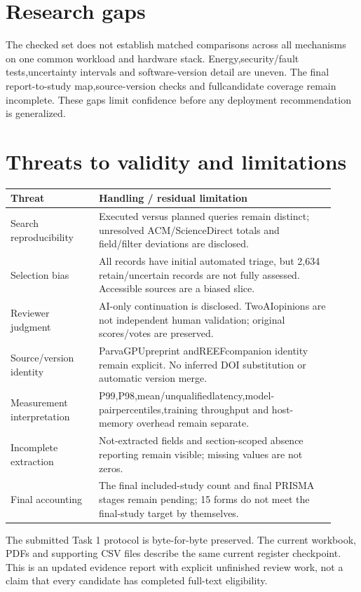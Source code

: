 \section{Research gaps}

The checked set does not establish matched comparisons across all mechanisms on one common workload and hardware stack. Energy,security/\allowbreak{}fault tests,uncertainty intervals and software-version detail are uneven. The final report-to-study map,source-version checks and fullcandidate coverage remain incomplete. These gaps limit confidence before any deployment recommendation is generalized.



\section{Threats to validity and limitations}


{\small\begin{longtable}{>{\raggedright\arraybackslash}p{0.25\linewidth}>{\raggedright\arraybackslash}p{0.67\linewidth}}
\toprule
Threat & Handling /\allowbreak{} residual limitation\\\midrule
\endhead
Search reproducibility & Executed versus planned queries remain distinct; unresolved ACM/\allowbreak{}ScienceDirect totals and field/\allowbreak{}filter deviations are disclosed.\\
Selection bias & All records have initial automated triage, but 2,634 retain/\allowbreak{}uncertain records are not fully assessed. Accessible sources are a biased slice.\\
Reviewer judgment & AI-only continuation is disclosed. TwoAIopinions are not independent human validation; original scores/\allowbreak{}votes are preserved.\\
Source/\allowbreak{}version identity & ParvaGPUpreprint andREEFcompanion identity remain explicit. No inferred DOI substitution or automatic version merge.\\
Measurement interpretation & P99,P98,mean/\allowbreak{}unqualifiedlatency,model-pairpercentiles,training throughput and host-memory overhead remain separate.\\
Incomplete extraction & Not-extracted fields and section-scoped absence reporting remain visible; missing values are not zeros.\\
Final accounting & The final included-study count and final PRISMA stages remain pending; 15 forms do not meet the final-study target by themselves.\\
\bottomrule
\end{longtable}}

The submitted Task 1 protocol is byte-for-byte preserved. The current workbook, PDFs and supporting CSV files describe the same current register checkpoint. This is an updated evidence report with explicit unfinished review work, not a claim that every candidate has completed full-text eligibility.


